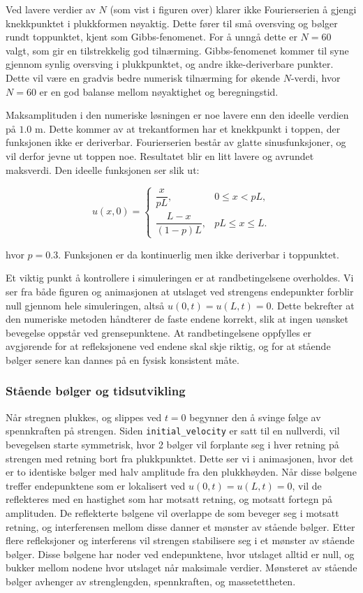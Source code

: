 Ved lavere verdier av $N$ (som vist i figuren over) klarer ikke Fourierserien å gjengi knekkpunktet i plukkformen nøyaktig. Dette fører til 
små oversving og bølger rundt toppunktet, kjent som Gibbs-fenomenet. For å unngå dette er $N=60$ valgt, som gir en tilstrekkelig god tilnærming.
Gibbs-fenomenet kommer til syne gjennom synlig oversving i plukkpunktet, og andre ikke-deriverbare punkter. Dette vil være en gradvis bedre numerisk
tilnærming for økende $N$-verdi, hvor $N=60$ er en god balanse mellom nøyaktighet og beregningstid.

Maksamplituden i den numeriske løsningen er noe lavere enn den ideelle verdien på $1.0$ m. Dette kommer av at trekantformen har et knekkpunkt i toppen, 
der funksjonen ikke er deriverbar. Fourierserien består av glatte sinusfunksjoner, og vil derfor jevne ut toppen noe. Resultatet blir en litt lavere og avrundet maksverdi. 
Den ideelle funksjonen ser slik ut:

\begin{equation*}
    u(x,0) =
        \begin{cases}
        \dfrac{x}{pL}, & 0 \le x < pL, \\[6pt]
        \dfrac{L - x}{(1 - p)L}, & pL \le x \le L.
        \end{cases}
\end{equation*}

hvor $p=0.3$. Funksjonen er da kontinuerlig men ikke deriverbar i toppunktet. 

Et viktig punkt å kontrollere i simuleringen er at randbetingelsene overholdes. 
Vi ser fra både figuren og animasjonen at utslaget ved strengens endepunkter forblir null gjennom hele simuleringen, altså $u(0,t)=u(L,t)=0$. 
Dette bekrefter at den numeriske metoden håndterer de faste endene korrekt, slik at ingen uønsket bevegelse oppstår ved grensepunktene. 
At randbetingelsene oppfylles er avgjørende for at refleksjonene ved endene skal skje riktig, og for at stående bølger senere kan dannes på en fysisk konsistent måte.

\subsubsection{Stående bølger og tidsutvikling}
Når stregnen plukkes, og slippes ved $t=0$ begynner den å svinge følge av spennkraften på strengen. Siden \verb|initial_velocity| er satt til en nullverdi, vil bevegelsen starte 
symmetrisk, hvor 2 bølger vil forplante seg i hver retning på strengen med retning bort fra plukkpunktet. Dette ser vi i animasjonen, hvor det er to identiske bølger med halv 
amplitude fra den plukkhøyden. Når disse bølgene treffer endepunktene som er lokalisert ved $u(0,t)=u(L,t)=0$, vil de reflekteres med en hastighet som har motsatt retning, og 
motsatt fortegn på amplituden. De reflekterte bølgene vil overlappe de som beveger seg i motsatt retning, og interferensen mellom disse danner et mønster av stående bølger.
Etter flere refleksjoner og interferens vil strengen stabilisere seg i et mønster av stående bølger. Disse bølgene har noder ved endepunktene, hvor utslaget alltid er null, og
bukker mellom nodene hvor utslaget når maksimale verdier. Mønsteret av stående bølger avhenger av strenglengden, spennkraften, og massetettheten.

